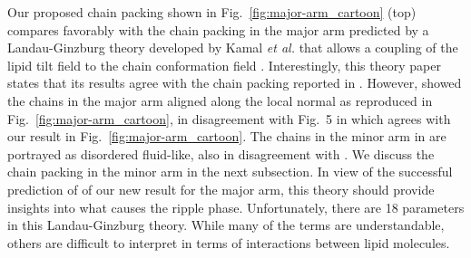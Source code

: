 Our proposed chain packing shown in Fig.~\ref{fig:major-arm_cartoon} (top)
compares favorably with the chain packing in the major arm predicted by
a Landau-Ginzburg theory developed by Kamal \textit{et al.} 
that allows a coupling of the lipid tilt field to the chain conformation field
\cite{ref:Kamal11}.
Interestingly, this theory paper \cite{ref:Kamal11} states that its results 
agree with the chain packing reported in \cite{ref:Sengupta03}. 
However, \cite{ref:Sengupta03} showed the chains in the major arm aligned along 
the local normal as reproduced in Fig.~\ref{fig:major-arm_cartoon}, in
disagreement with Fig.~5 in \cite{ref:Kamal11} which agrees with our result 
in Fig.~\ref{fig:major-arm_cartoon}. The chains in the minor arm in \cite{ref:Kamal11} 
are portrayed as disordered fluid-like, also in disagreement with \cite{ref:Sengupta03}.  
We discuss the chain packing in the minor arm in the next subsection.
In view of the successful prediction of \cite{ref:Kamal11} of our new result 
for the major arm, this theory should provide insights into what causes the 
ripple phase. Unfortunately, there are 18 parameters in this Landau-Ginzburg 
theory. While many of the terms are understandable, others are difficult to 
interpret in terms of interactions between lipid molecules.

